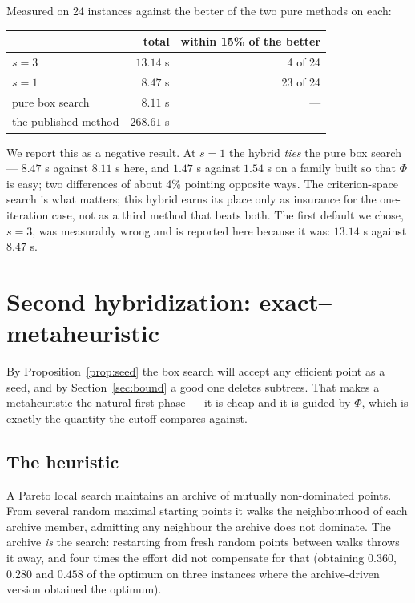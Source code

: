 \documentclass[11pt,a4paper]{article}
\begin{document}
Measured on 24 instances against the better of the two pure methods on each:

\begin{table}[h]
\centering
\begin{tabular}{lrr}
\toprule
 & total & within 15\% of the better \\
\midrule
$s = 3$              & $13.14$ s  & 4 of 24 \\
$s = 1$              & $8.47$ s   & 23 of 24 \\
pure box search      & $8.11$ s   & --- \\
the published method & $268.61$ s & --- \\
\bottomrule
\end{tabular}
\end{table}

\noindent
We report this as a negative result. At $s = 1$ the hybrid \emph{ties} the pure
box search --- $8.47$ s against $8.11$ s here, and $1.47$ s against $1.54$ s on
a family built so that $\Phi$ is easy; two differences of about 4\% pointing
opposite ways. The criterion-space search is what matters; this hybrid earns
its place only as insurance for the one-iteration case, not as a third method
that beats both. The first default we chose, $s = 3$, was measurably wrong and
is reported here because it was: $13.14$ s against $8.47$ s.

\section{Second hybridization: exact--metaheuristic}\label{sec:meta}

By Proposition~\ref{prop:seed} the box search will accept any efficient point
as a seed, and by Section~\ref{sec:bound} a good one deletes subtrees. That
makes a metaheuristic the natural first phase --- it is cheap and it is guided
by $\Phi$, which is exactly the quantity the cutoff compares against.

\subsection{The heuristic}

A Pareto local search maintains an archive of mutually non-dominated points.
From several random maximal starting points it walks the neighbourhood of each
archive member, admitting any neighbour the archive does not dominate. The
archive \emph{is} the search: restarting from fresh random points between walks
throws it away, and four times the effort did not compensate for that
(obtaining $0.360$, $0.280$ and $0.458$ of the optimum on three instances where
the archive-driven version obtained the optimum).
\end{document}
